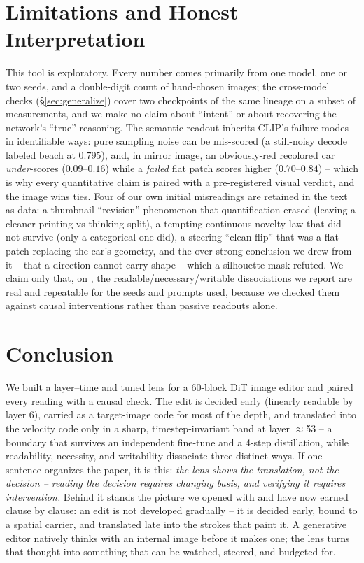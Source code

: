 \section{Limitations and Honest Interpretation}\label{sec:limits}

This tool is exploratory. Every number comes primarily from one model,
one or two seeds, and a double-digit count of hand-chosen images; the
cross-model checks (\S\ref{sec:generalize}) cover two checkpoints of the
same lineage on a subset of measurements, and we make no claim about
``intent'' or about recovering the network's ``true'' reasoning. The
semantic readout inherits CLIP's failure modes in identifiable ways: pure
sampling noise can be mis-scored (a still-noisy decode labeled beach at
$0.795$), and, in mirror image, an obviously-red recolored car
\emph{under}-scores ($0.09$--$0.16$) while a \emph{failed} flat patch
scores higher ($0.70$--$0.84$) -- which is why every quantitative claim is
paired with a pre-registered visual verdict, and the image wins ties. Four
of our own initial misreadings are retained in the text as data: a
thumbnail ``revision'' phenomenon that quantification erased (leaving a
cleaner printing-vs-thinking split), a tempting continuous novelty law
that did not survive (only a categorical one did), a steering ``clean
flip'' that was a flat patch replacing the car's geometry, and the
over-strong conclusion we drew from it -- that a direction cannot carry
shape -- which a silhouette mask refuted. We claim only that, on \model{},
the readable/necessary/writable dissociations we report are real and
repeatable for the seeds and prompts used, because we checked them
against causal interventions rather than passive readouts alone.

\section{Conclusion}\label{sec:conclusion}

We built a layer--time and tuned lens for a 60-block DiT image editor and
paired every reading with a causal check. The edit is decided early
(linearly readable by layer 6), carried as a target-image code for most of
the depth, and translated into the velocity code only in a sharp,
timestep-invariant band at layer $\approx$53 -- a boundary that survives an
independent fine-tune and a 4-step distillation, while readability,
necessity, and writability dissociate three distinct ways. If one sentence
organizes the paper, it is this: \emph{the lens shows the translation, not
the decision -- reading the decision requires changing basis, and verifying
it requires intervention.} Behind it stands the picture we opened with and
have now earned clause by clause: an edit is not developed gradually -- it
is decided early, bound to a spatial carrier, and translated late into the
strokes that paint it. A generative editor natively thinks with an internal
image before it makes one; the lens turns that thought into something that
can be watched, steered, and budgeted for.
